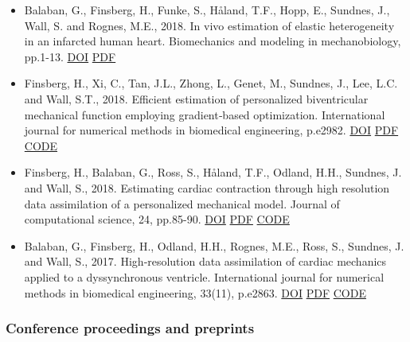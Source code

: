 \documentclass[11pt, a4paper]{article}
\begin{document}
\begin{raggedright}
\begin{itemize}
\item
  Balaban, G., Finsberg, H., Funke, S., Håland, T.F., Hopp, E., Sundnes,
  J., Wall, S. and Rognes, M.E., 2018. In vivo estimation of elastic
  heterogeneity in an infarcted human heart. Biomechanics and modeling
  in mechanobiology, pp.1-13.
  \href{https://doi.org/10.1007/s10237-018-1028-5}{DOI}
  \href{https://link.springer.com/content/pdf/10.1007\%2Fs10237-018-1028-5.pdf}{PDF}
\item
  Finsberg, H., Xi, C., Tan, J.L., Zhong, L., Genet, M., Sundnes, J.,
  Lee, L.C. and Wall, S.T., 2018. Efficient estimation of personalized
  biventricular mechanical function employing gradient‐based
  optimization. International journal for numerical methods in
  biomedical engineering, p.e2982.
  \href{https://doi.org/10.1002/cnm.2982}{DOI}
  \href{https://onlinelibrary.wiley.com/doi/pdf/10.1002/cnm.2982}{PDF}
  \href{https://bitbucket.org/finsberg/efficient-estimation-of-personalized-biventricular-mechanical}{CODE}
\item
  Finsberg, H., Balaban, G., Ross, S., Håland, T.F., Odland, H.H.,
  Sundnes, J. and Wall, S., 2018. Estimating cardiac contraction through
  high resolution data assimilation of a personalized mechanical model.
  Journal of computational science, 24, pp.85-90.
  \href{https://doi.org/10.1016/j.jocs.2017.07.013}{DOI}
  \href{https://www.sciencedirect.com/science/article/pii/S1877750317308190/pdfft?md5=3f7bbc82a870dc84f5080564c7f3c33a\&pid=1-s2.0-S1877750317308190-main.pdf}{PDF}
  \href{https://bitbucket.org/finsberg/estimate_cardiac_contraction}{CODE}
\item
  Balaban, G., Finsberg, H., Odland, H.H., Rognes, M.E., Ross, S.,
  Sundnes, J. and Wall, S., 2017. High‐resolution data assimilation of
  cardiac mechanics applied to a dyssynchronous ventricle. International
  journal for numerical methods in biomedical engineering, 33(11),
  p.e2863. \href{https://doi.org/10.1002/cnm.2863}{DOI}
  \href{https://www.duo.uio.no/bitstream/handle/10852/62016/Balaban_et_al-2017-cnm-2863.pdf}{PDF}
  \href{https://bitbucket.org/finsberg/cardiac_highres_dataassim}{CODE}
\end{itemize}

\hypertarget{conference-proceedings-and-preprints}{%
\subsubsection{Conference proceedings and
preprints}\label{conference-proceedings-and-preprints}}


\end{raggedright}
\end{document}
